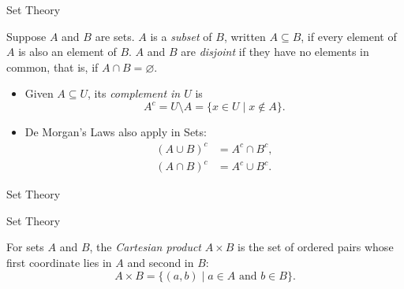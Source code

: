 \documentclass[11pt,aspectratio=169,c]{beamer}
\begin{document}
\begin{frame}{Set Theory}
\small
\begin{definitionbox}[Definition 1.4.5]
Suppose $A$ and $B$ are sets. $A$ is a \emph{subset} of $B$, written
$A\subseteq B$, if every element of $A$ is also an element of $B$. $A$ and $B$
are \emph{disjoint} if they have no elements in common, that is, if
$A\cap B=\varnothing$.
\end{definitionbox}

\begin{itemize}
    \item Given $A\subseteq U$, its \emph{complement in $U$} is
    \[
    A^c=U\setminus A=\{x\in U\mid x\notin A\}.
    \]
    \item De Morgan's Laws also apply in Sets:
    \[
    \begin{aligned}
    (A \cup B)^{c} &= A^{c} \cap B^{c},\\[0.3em]
    (A \cap B)^{c} &= A^{c} \cup B^{c}.
    \end{aligned}
    \]

\end{itemize}
\end{frame}

\begin{frame}{Set Theory}
\vspace{0.45cm}
\begin{center}
\end{center}
\end{frame}

\begin{frame}{Set Theory}
\begin{definitionbox}[Definition 4.1.1]
For sets $A$ and $B$, the \emph{Cartesian product} $A\times B$ is the set of
ordered pairs whose first coordinate lies in $A$ and second in $B$:
\[
A\times B=\{(a,b)\mid a\in A\text{ and }b\in B\}.
\]
\end{definitionbox}
\end{frame}
\end{document}
